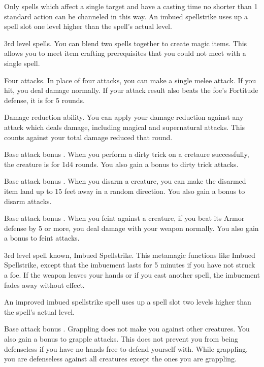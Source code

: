 Only spells which affect a single target and have a casting time no shorter than 1 standard action can be channeled in this way.
An imbued spellstrike uses up a spell slot one level higher than the spell's actual level.

\featpre 3rd level spells.
\featben You can blend two spells together to create magic items.
This allows you to meet item crafting prerequisites that you could not meet with a single spell.

\featpre Four attacks.
\featben In place of four attacks, you can make a single melee attack.
If you hit, you deal damage normally.
If your attack result also beats the foe's Fortitude defense, it is \immobilized for 5 rounds.

\featpre Damage reduction ability.
\featben You can apply your damage reduction against any attack which deals damage, including magical and supernatural attacks.
This counts against your total damage reduced that round.

\featpre Base attack bonus .
\featben When you perform a dirty trick on a cretaure successfully, the creature is \impaired for 1d4 rounds.
You also gain a  bonus to dirty trick attacks.

\featpre Base attack bonus .
\featben When you disarm a creature, you can make the disarmed item land up to 15 feet away in a random direction.
You also gain a  bonus to disarm attacks.

\featpre Base attack bonus .
\featben When you feint against a creature, if you beat its Armor defense by 5 or more, you deal damage with your weapon normally.
You also gain a  bonus to feint attacks.

\featpres 3rd level spell known, Imbued Spellstrike.
\featben This metamagic functions like Imbued Spellstrike, except that the imbuement lasts for 5 minutes if you have not struck a foe.
If the weapon leaves your hands or if you cast another spell, the imbuement fades away without effect.

An improved imbued spellstrike spell uses up a spell slot two levels higher than the spell's actual level.

\featpre Base attack bonus .
\featben Grappling does not make you  against other creatures.
You also gain a  bonus to grapple attacks.
This does not prevent you from being defenseless if you have no hands free to defend yourself with.
While grappling, you are defenseless against all creatures except the ones you are grappling.

